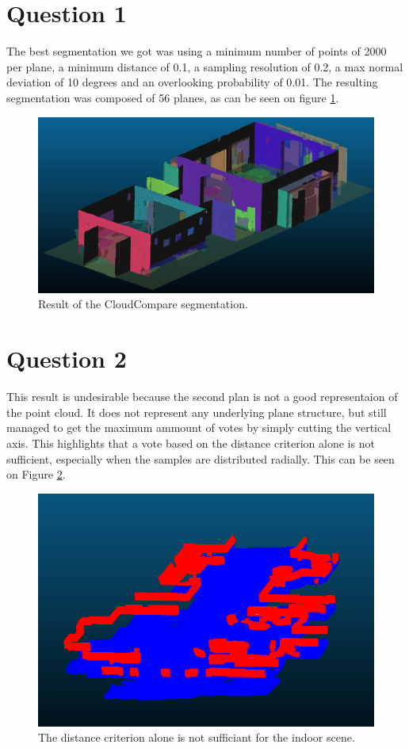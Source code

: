\documentclass[a4paper]{article}
\begin{document}





\section*{Question 1}

The best segmentation we got was using a minimum number of points of 2000 per plane, a minimum distance of 0.1, a sampling resolution of 0.2, a max normal deviation of 10 degrees and an overlooking probability of 0.01.
The resulting segmentation was composed of 56 planes, as can be seen on figure \ref{fig:Q1}.

\begin{figure}[ht]
    \centering
    \includegraphics[width=0.3\linewidth]{figures/Q1.png}
    \caption{Result of the CloudCompare segmentation.}
    \label{fig:Q1}
\end{figure}


\section*{Question 2}

This result is undesirable because the second plan is not a good representaion of the point cloud. It does not represent any underlying plane structure,
but still managed to get the maximum ammount of votes by simply cutting the vertical axis. This highlights that a vote based on the distance criterion alone is not sufficient, especially 
when the samples are distributed radially. This can be seen on Figure \ref{fig:Q2}.

\begin{figure}[ht]
    \centering
    \includegraphics[width=0.3\linewidth]{figures/Q2.png}
    \caption{The distance criterion alone is not sufficiant for the indoor scene.}
    \label{fig:Q2}
\end{figure}
\end{document}
